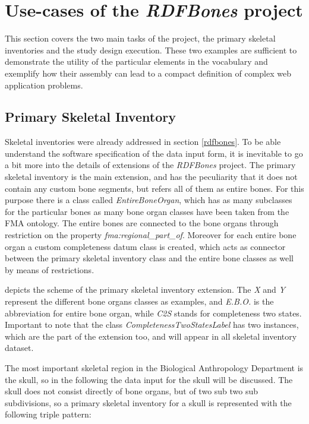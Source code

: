 
\section{Use-cases of the \textit{RDFBones} project}

This section covers the two main tasks of the project, the primary skeletal inventories and the study design execution. These two examples are sufficient to demonstrate the utility of the particular elements in the vocabulary and exemplify how their assembly can lead to a compact definition of complex web application problems. 

\subsection{Primary Skeletal Inventory}

Skeletal inventories were already addressed in section \ref{rdfbones}. To be able understand the software specification of the data input form, it is inevitable to go a bit more into the details of extensions of the \textit{RDFBones} project. The primary skeletal inventory is the main extension, and has the peculiarity that it does not contain any custom bone segments, but refers all of them as entire bones. For this purpose there is a class called \textit{EntireBoneOrgan}, which has as many subclasses for the particular bones as many bone organ classes have been taken from the FMA ontology. The entire bones are connected to the bone organs through restriction on the property \textit{fma:regional\_part\_of}. Moreover for each entire bone organ a custom completeness datum class is created, which acts as connector between the primary skeletal inventory class and the entire bone classes as well by means of restrictions. 


 depicts the scheme of the primary skeletal inventory extension. The \textit{X} and \textit{Y} represent the different bone organs classes as examples, and \textit{E.B.O.} is the abbreviation for entire bone organ, while \textit{C2S} stands for completeness two states. Important to note that the class \textit{CompletenessTwoStatesLabel} has two instances, which are the part of the extension too, and will appear in all skeletal inventory dataset.

The most important skeletal region in the Biological Anthropology Department is the skull, so in the following the data input for the skull will be discussed. The skull does not consist directly of bone organs, but of two sub two sub subdivisions, so a primary skeletal inventory for a skull is represented with the following triple pattern: 

